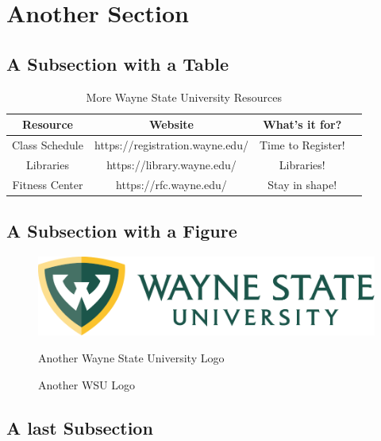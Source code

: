 \section{Another Section}
\label{chap:Related Work}

\subsection{A Subsection with a Table}

\begin{table}[!h]
    \centering	
    \bgroup
    \def\arraystretch{1.00}
    \begin{tabular}{| c | c | c | c |}
          \hline			
          Resource & Website & What's it for? \\ \hline \hline \cline{1-3}
          Class Schedule & https://registration.wayne.edu/ & Time to Register! \\ \hline
          Libraries & https://library.wayne.edu/ & Libraries!\\ \hline
          Fitness Center & https://rfc.wayne.edu/ & Stay in shape!\\ \hline
    \end{tabular}
    \egroup
    \caption{More Wayne State University Resources}
    \label{tab:WSUresources2}
\end{table}

\subsection{A Subsection with a Figure}

\begin{figure}[!htbp]
    \centering
    \includegraphics[width=0.50\linewidth]{fig/wsu_primary_horz_color.pdf}
    \caption{Another WSU Logo} Another Wayne State University Logo
    \label{fig:WSUlogo2}
\end{figure}

\subsection{A last Subsection}
